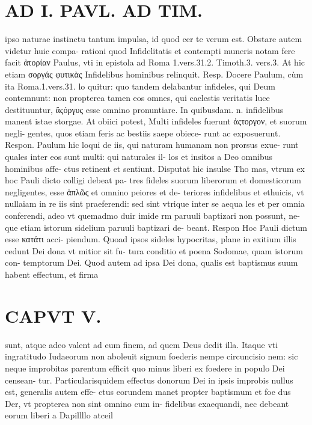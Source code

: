 \documentclass{article}
\begin{document}
\begin{pages}
\section*{AD I. PAVL. AD TIM. }
\marginpar{[ p.268 ]}\pstart ipso naturae instinctu tantum impulsa, id quod cer te verum est. Obstare autem videtur huic compa- rationi quod Infidelitatis et contempti muneris notam fere facit ἀτορίαν Paulus, vti in epistola ad Roma 1.vers.31.2. Timoth.3. vers.3. At hic etiam σοργάς φυτικὰς Infidelibus hominibus relinquit. Resp. Docere Paulum, cùm ita Roma.1.vers.31. lo quitur: quo tandem delabantur infideles, qui Deum contemnunt: non propterea tamen eos omnes, qui caelestis veritatis luce destituuntur, ἄςόργυς esse omnino pronuntiare. In quibusdam. n. infidelibus manent istae storgae. At obiici potest, Multi infideles fuerunt ἀςτοργον, et suorum negli- gentes, quos etiam feris ac bestiis saepe obiece- runt ac exposuerunt. Respon. Paulum hic loqui de iis, qui naturam humanam non prorsus exue- runt quales inter eos sunt multi: qui naturales il- los et insitos a Deo omnibus hominibus affe- ctus retinent et sentiunt. Disputat hic insulse Tho mas, vtrum ex hoc Pauli dicto colligi debeat pa- tres fideles suorum liberorum et domesticorum negligentes, esse ἀπλῶς et omnino peiores et de- teriores infidelibus et ethuicis, vt nullaiam in re iis sint praeferendi: sed sint vtrique inter se aequa les et per omnia conferendi, adeo vt quemadmo duir imide rm paruuli baptizari non possunt, ne- que etiam istorum sidelium paruuli baptizari de- beant. Respon Hoc Pauli dictum esse κατάτι acci- piendum. Quoad ipsos sideles hypocritas, plane in exitium illis cedunt Dei dona vt mitior sit fu- tura conditio et poena Sodomae, quam istorum con- temptorum Dei. Quod autem ad ipsa Dei dona, qualis est baptismus suum habent effectum, et firma  \pend
\section*{CAPVT  V. }
\marginpar{[ p.269 ]}\pstart sunt, atque adeo valent ad eum finem, ad quem Deus dedit illa. Itaque vti ingratitudo Iudaeorum non aboleuit signum foederis nempe circuncisio nem: sic neque improbitas parentum efficit quo minus liberi ex foedere in populo Dei censean- tur. Particularisquidem effectus donorum Dei in ipsis improbis nullus est, generalis autem effe- ctus eorundem manet propter baptismum et foe dus Der, vt propterea non sint omnino cum in- fidelibus exaequandi, nec debeant eorum liberi a Dapillllo atceil  \pend
{}
{}

\end{pages}
\end{document}
